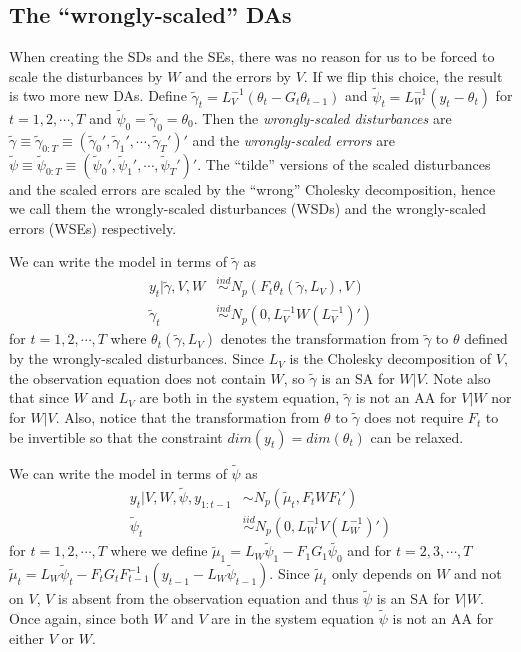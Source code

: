 \documentclass[12pt]{article}
\begin{document}
\subsection{The ``wrongly-scaled'' DAs}
When creating the SDs and the SEs, there was no reason for us to be forced to scale the disturbances by $W$ and the errors by $V$. If we flip this choice, the result is two more new DAs. Define $\tilde{\gamma}_t=L_V^{-1}(\theta_t - G_t\theta_{t-1})$ and $\tilde{\psi}_t=L_W^{-1}(y_t - \theta_t)$ for $t=1,2,\cdots,T$ and $\tilde{\psi}_0=\tilde{\gamma}_0=\theta_0$. Then the {\it wrongly-scaled disturbances} are $\tilde{\gamma}\equiv\tilde{\gamma}_{0:T}\equiv(\tilde{\gamma}_0',\tilde{\gamma}_1',\cdots,\tilde{\gamma}_T')'$ and the {\it wrongly-scaled errors} are $\tilde{\psi}\equiv\tilde{\psi}_{0:T}\equiv(\tilde{\psi}_0',\tilde{\psi}_1',\cdots,\tilde{\psi}_T')'$. The ``tilde'' versions of the scaled disturbances and the scaled errors are scaled by the ``wrong'' Cholesky decomposition, hence we call them the wrongly-scaled disturbances (WSDs) and the wrongly-scaled errors (WSEs) respectively.

We can write the model in terms of $\tilde{\gamma}$ as
\begin{align*}
  y_t|\tilde{\gamma},V,W & \stackrel{ind}{\sim} N_p\left(F_t\theta_t(\tilde{\gamma},L_V), V\right)\\
  \tilde{\gamma}_t & \stackrel{ind}{\sim}N_p(0,L_V^{-1}W(L_V^{-1})')
\end{align*}
for $t=1,2,\cdots,T$ where $\theta_t(\tilde{\gamma},L_V)$ denotes the transformation from $\tilde{\gamma}$ to $\theta$ defined by the wrongly-scaled disturbances. Since $L_V$ is the Cholesky decomposition of $V$, the observation equation does not contain $W$, so $\tilde{\gamma}$ is an SA for $W|V$. Note also that since $W$ and $L_V$ are both in the system equation, $\tilde{\gamma}$ is not an AA for $V|W$ nor for $W|V$. Also, notice that the transformation from $\theta$ to $\tilde{\gamma}$ does not require $F_t$ to be invertible so that the constraint $dim(y_t)=dim(\theta_t)$ can be relaxed.

We can write the model in terms of $\tilde{\psi}$ as
 \begin{align*}
   y_t|V,W,\tilde{\psi},y_{1:t-1} &\sim N_p(\tilde{\mu}_t, F_tWF_t')\\
   \tilde{\psi}_t & \stackrel{iid}{\sim} N_p(0,L_W^{-1}V(L_W^{-1})')
\end{align*}
for $t=1,2,\cdots,T$ where we define $\tilde{\mu}_1 = L_W\tilde{\psi}_1 - F_1G_1\tilde{\psi_0}$ and for $t=2,3,\cdots,T$ $\tilde{\mu}_t =L_W\tilde{\psi}_t - F_tG_tF_{t-1}^{-1}(y_{t-1} - L_{W}\tilde{\psi}_{t-1})$. Since $\tilde{\mu}_t$ only depends on $W$ and not on $V$, $V$ is absent from the observation equation and thus $\tilde{\psi}$ is an SA for $V|W$. Once again, since both $W$ and $V$ are in the system equation $\tilde{\psi}$ is not an AA for either $V$ or $W$.
\end{document}
